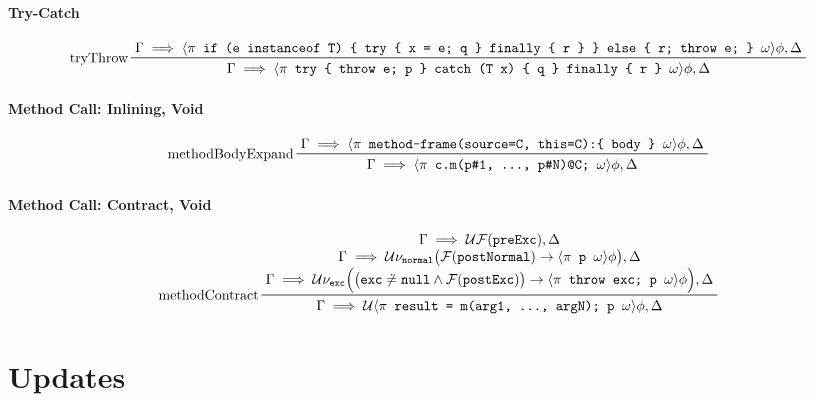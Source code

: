 			\paragraph{Try-Catch} %
			{ \footnotesize \begin{equation*}
				\prftree[l]
					{tryThrow}
					{\Gamma \implies \langle \pi \texttt{ if (e instanceof T) \{ try \{ x = e; q \} finally \{ r \} \} else \{ r; throw e; \} } \omega \rangle \phi, \Delta}
					{\Gamma \implies \langle \pi \texttt{ try \{ throw e; p \} catch (T x) \{ q \} finally \{ r \} } \omega \rangle \phi, \Delta}
			\end{equation*} }
		
			\paragraph{Method Call: Inlining, Void} %
			\begin{equation*}
				\prftree[l]
					{methodBodyExpand}
					{\Gamma \implies \langle \pi \texttt{ method-frame(source=C, this=C):\{ body \} } \omega \rangle \phi, \Delta}
					{\Gamma \implies \langle \pi \texttt{ c.m(p\#1, ..., p\#N)@C; } \omega\rangle \phi, \Delta}
			\end{equation*}
			
			\paragraph{Method Call: Contract, Void} %
			\begin{equation*}
				\prftree[l]
					{methodContract}
					{\let\scriptstyle\textstyle \substack{
					 \Gamma \implies \mathcal{U} \mathcal{F}(\texttt{preExc}), \Delta \\
					 \Gamma \implies \mathcal{U} \nu_\texttt{normal} \big( \mathcal{F}(\texttt{postNormal}) \to \langle \pi \texttt{ p } \omega \rangle \phi \big), \Delta \\
					 \Gamma \implies \mathcal{U} \nu_\texttt{exc} \Big( \big( \texttt{exc} \not\doteq \texttt{null} \land \mathcal{F}(\texttt{postExc}) \big) \to \langle \pi \texttt{ throw exc; p } \omega \rangle \phi \Big), \Delta}}
					{\Gamma \implies \mathcal{U} \langle \pi \texttt{ result = m(arg1, ..., argN); p } \omega \rangle \phi, \Delta}
			\end{equation*}
		

	\section{Updates}
		
